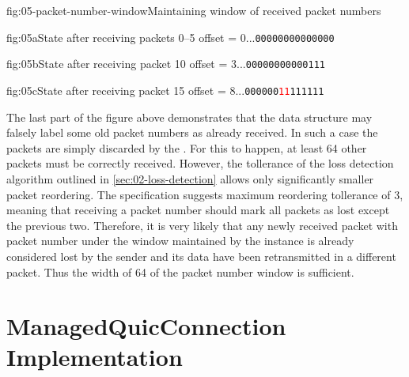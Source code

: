 \begin{myFigure}{fig:05-packet-number-window}{Maintaining window of received packet numbers}

  \begin{mySubfigure}{\textwidth}{fig:05a}{State after receiving packets 0--5}
    offset = 0\hspace{1cm}...\texttt{\textcolor{colorunimportant}{00000000000000}}
  \end{mySubfigure}

  \medskip

  \begin{mySubfigure}{\textwidth}{fig:05b}{State after receiving packet 10}
    offset = 3\hspace{1cm}...\texttt{\textcolor{colorunimportant}{00000000000}\textcolor{colorunimportant}{111}}
  \end{mySubfigure}

  \medskip

  \begin{mySubfigure}{\textwidth}{fig:05c}{State after receiving packet 15}
    offset = 8\hspace{1cm}...\texttt{\textcolor{colorunimportant}{000000}\textcolor{red}{11}\textcolor{colorunimportant}{111111}}
  \end{mySubfigure}

\end{myFigure}

The last part of the figure above demonstrates that the data structure may falsely label some old
packet numbers as already received. In such a case the packets are simply discarded by the
\ManagedQuicConnection{}. For this to happen, at least 64 other packets must be correctly received.
However, the tollerance of the loss detection algorithm outlined in \autoref{sec:02-loss-detection}
allows only significantly smaller packet reordering. The specification suggests maximum reordering
tollerance of 3, meaning that receiving a packet number should mark all packets as lost except the
previous two. Therefore, it is very likely that any newly received packet with packet number under
the window maintained by the \PacketNumberWindow{} instance is already considered lost by the sender
and its data have been retransmitted in a different packet. Thus the width of 64 of the packet
number window is sufficient.

\section{ManagedQuicConnection Implementation}

